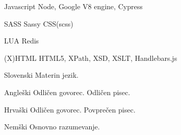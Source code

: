 \begin{cvskills}
\cvskill
{Javascript} %
{Node, Google V8 engine, Cypress} %

\cvskill
{SASS} %
{Sassy CSS(scss)} %

\cvskill
{LUA} %
{Redis} %

\cvskill
{(X)HTML} %
{HTML5, XPath, XSD, XSLT, Handlebars.js} %
\end{cvskills}




\begin{cvskills}


\cvskill
{Slovenski} %
{Materin jezik.} %


\cvskill
{Angleški} %
{Odličen govorec. Odličen pisec.} %


\cvskill
{Hrvaški} %
{Odličen govorec. Povprečen pisec.} %


\cvskill
{Nemški} %
{Osnovno razumevanje.} %

\end{cvskills}


